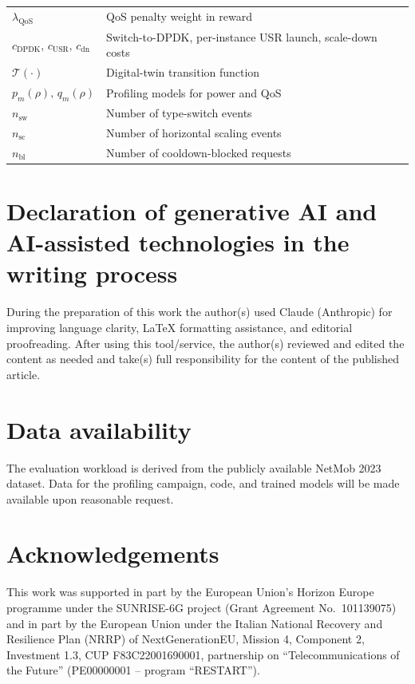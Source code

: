 \documentclass[a4paper,fleqn]{cas-sc}
\begin{document}
\begin{table}[width=.9\linewidth,cols=2,pos=h]
\begin{tabular}{l l}
$\lambda_{\mathrm{QoS}}$ & QoS penalty weight in reward \\
$c_{\mathrm{DPDK}},\,c_{\mathrm{USR}},\,c_{\mathrm{dn}}$ & Switch-to-DPDK, per-instance USR launch, scale-down costs \\
$\mathcal{T}(\cdot)$ & Digital-twin transition function \\
$p_m(\rho),\,q_m(\rho)$ & Profiling models for power and QoS \\
$n_{\mathrm{sw}}$ & Number of type-switch events \\
$n_{\mathrm{sc}}$ & Number of horizontal scaling events \\
$n_{\mathrm{bl}}$ & Number of cooldown-blocked requests \\
\hline
\end{tabular}
\end{table}



\printcredits

\section*{Declaration of generative AI and AI-assisted technologies in the writing process}
During the preparation of this work the author(s) used Claude (Anthropic) for improving language clarity, \LaTeX{} formatting assistance, and editorial proofreading. After using this tool/service, the author(s) reviewed and edited the content as needed and take(s) full responsibility for the content of the published article.
\section*{Data availability}
The evaluation workload is derived from the publicly available NetMob 2023 
dataset. Data for the profiling campaign, code, and trained models will be made available upon reasonable request.
\section*{Acknowledgements}
This work was supported in part by the European Union's Horizon Europe programme under the SUNRISE-6G project (Grant Agreement No.\ 101139075) and in part by the European Union under the Italian National Recovery and Resilience Plan (NRRP) of NextGenerationEU, Mission 4, Component 2, Investment 1.3, CUP F83C22001690001, partnership on ``Telecommunications of the Future'' (PE00000001 -- program ``RESTART'').


% 



\end{document}
